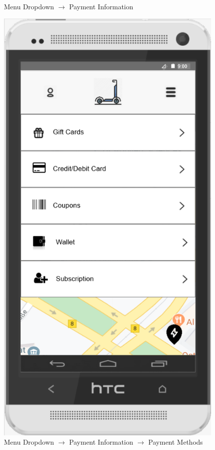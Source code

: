\documentclass[a4paper, 12pt]{article}
\begin{document}
\begin{figure} [htbp]
\begin{center}
\begin{minipage}{0.45\textwidth}
\begin{center}
            \end{center}
            \caption{Menu Dropdown $\rightarrow$ Payment Information}
        \end{minipage}\hfill
        \begin{minipage}{0.45\textwidth}
            \begin{center}
                \includegraphics[scale=0.65]{images/prototypes/02-02-01-menu-dropdown--payment-information--payment-methods.png}
            \end{center}
            \caption{Menu Dropdown $\rightarrow$ Payment Information $\rightarrow$ Payment Methods}
        \end{minipage}
    \end{center}
\end{figure}
\end{document}
